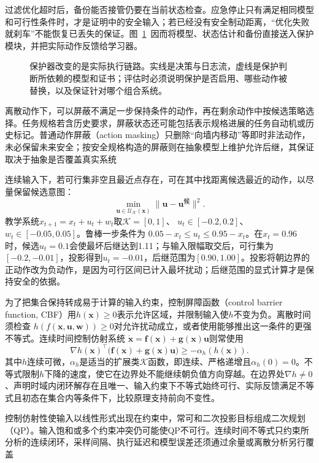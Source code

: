 过滤优化超时后，备份能否接管仍要在当前状态检查。应急停止只有满足相同模型和可行性条件时，才是证明中的安全输入；若已经没有安全制动距离，“优化失败就刹车”不能恢复已丢失的保证。图~\ref{fig:rl-trustworthy-filter}~因而将模型、状态估计和备份直接送入保护模块，并把实际动作反馈给学习器。

\begin{figure}[t]
  \centering
  
  \caption{保护器改变的是实际执行链路。实线是决策与日志流，虚线是保护判断所依赖的模型和证书；评估时必须说明保护是否启用、哪些动作被替换，以及保证针对哪个组合系统。}
  \label{fig:rl-trustworthy-filter}
\end{figure}

离散动作下，可以屏蔽不满足一步保持条件的动作，再在剩余动作中按候选策略选择。任务规格若含历史要求，屏蔽状态还可能包括表示规格进展的任务自动机或历史标记。普通动作屏蔽（action masking）只删除“向墙内移动”等即时非法动作，未必保留未来安全；按安全规格构造的屏蔽则在抽象模型上维护允许后继，其保证取决于抽象是否覆盖真实系统

连续输入下，若可行集非空且最近点存在，可在其中找距离候选最近的动作，以尽量保留候选意图：
\[
  \min_{\bm{u}\in\mathcal U_{\mathcal K}(\bm{x})}
          \|\bm{u}-\bm{u}^{\text{候}}\|^2.
\]
教学系统$x_{t+1}=x_t+u_t+w_t$取$\mathcal K=[0,1]$、
$u_t\in[-0.2,0.2]$、$w_t\in[-0.05,0.05]$。鲁棒一步条件为
$0.05-x_t\leq u_t\leq0.95-x_t$。在$x_t=0.96$时，候选$u_t=0.1$会使最坏后继达到1.11；与输入限幅取交后，可行集为$[-0.2,-0.01]$，投影得到$u_t=-0.01$，后继范围为$[0.90,1.00]$。投影将朝边界的正动作改为负动作，是因为可行区间已计入最坏扰动；后继范围的显式计算才是保持安全的依据。

为了把集合保持转成易于计算的输入约束，控制屏障函数（control barrier function, CBF）用$h(\bm{x})\geq0$表示允许区域，并限制输入使$h$不变为负。离散时间须检查
$h(f(\bm{x},\bm{u},\bm{w}))\geq0$对允许扰动成立，或者使用能够推出这一条件的更强不等式。连续时间控制仿射系统
$\dot{\bm{x}}=\bm{f}(\bm{x})+\bm{g}(\bm{x})\bm{u}$则常使用
\[
  \nabla h(\bm{x})^\top
       \bigl(\bm{f}(\bm{x})+\bm{g}(\bm{x})\bm{u}\bigr)
        \geq-\alpha_h(h(\bm{x})).
\]
其中$h$连续可微，$\alpha_h$是适当的扩展类$\mathcal K$函数，即连续、严格递增且$\alpha_h(0)=0$。不等式限制$h$下降的速度，使它在边界处不能继续朝负值方向穿越。在边界处$\nabla h\neq0$、声明时域内闭环解存在且唯一、输入约束下不等式始终可行、实际反馈满足不等式且初态在集合内等条件下，比较原理支持前向不变性。

控制仿射性使输入以线性形式出现在约束中，常可和二次投影目标组成二次规划（QP）。输入饱和或多个约束冲突仍可能使QP不可行。连续时间不等式只约束所分析的连续闭环，采样间隔、执行延迟和模型误差还须通过余量或离散分析另行覆盖

